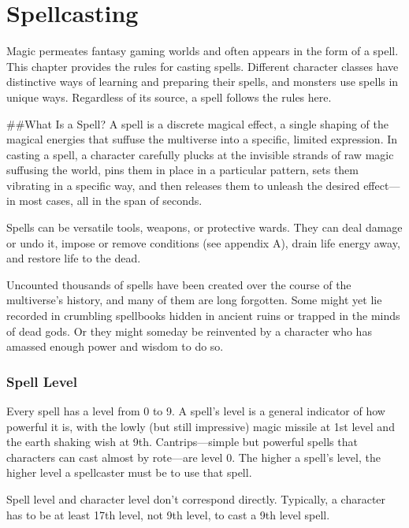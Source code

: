 \documentclass[
]{article}
\date{}
\begin{document}
\hypertarget{spellcasting}{%
\section{Spellcasting}\label{spellcasting}}

Magic permeates fantasy gaming worlds and often appears in the form of a
spell. This chapter provides the rules for casting spells. Different
character classes have distinctive ways of learning and preparing their
spells, and monsters use spells in unique ways. Regardless of its
source, a spell follows the rules here.

\#\#What Is a Spell? A spell is a discrete magical effect, a single
shaping of the magical energies that suffuse the multiverse into a
specific, limited expression. In casting a spell, a character carefully
plucks at the invisible strands of raw magic suffusing the world, pins
them in place in a particular pattern, sets them vibrating in a specific
way, and then releases them to unleash the desired effect---in most
cases, all in the span of seconds.

Spells can be versatile tools, weapons, or protective wards. They can
deal damage or undo it, impose or remove conditions (see appendix A),
drain life energy away, and restore life to the dead.

Uncounted thousands of spells have been created over the course of the
multiverse's history, and many of them are long forgotten. Some might
yet lie recorded in crumbling spellbooks hidden in ancient ruins or
trapped in the minds of dead gods. Or they might someday be reinvented
by a character who has amassed enough power and wisdom to do so.

\hypertarget{spell-level}{%
\subsubsection{Spell Level}\label{spell-level}}

Every spell has a level from 0 to 9. A spell's level is a general
indicator of how powerful it is, with the lowly (but still impressive)
magic missile at 1st level and the earth shaking wish at 9th.
Cantrips---simple but powerful spells that characters can cast almost by
rote---are level 0. The higher a spell's level, the higher level a
spellcaster must be to use that spell.

Spell level and character level don't correspond directly. Typically, a
character has to be at least 17th level, not 9th level, to cast a 9th
level spell.
\end{document}
